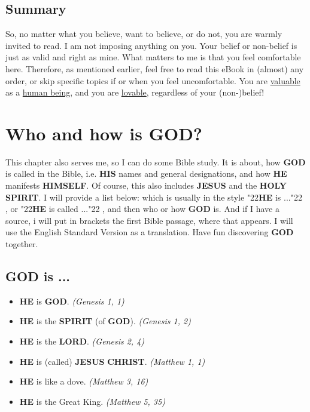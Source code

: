 \documentclass[10pt,a5paper]{article}
\newcommand{\Christ}[0]{\textbf{CHRIST}}
\newcommand{\God}[0]{\textbf{GOD}}
\newcommand{\He}[0]{\textbf{HE}}
\newcommand{\Himself}[0]{\textbf{HIMSELF}}
\newcommand{\His}[0]{\textbf{HIS}}
\newcommand{\Holy}[0]{\textbf{HOLY}}
\newcommand{\Jesus}[0]{\textbf{JESUS}}
\newcommand{\Lord}[0]{\textbf{LORD}}
\newcommand{\Spirit}[0]{\textbf{SPIRIT}}
\newcommand{\q}[1]{\char"22{#1}\char"22 }
\begin{document}
	\subsection{Summary}
		So,
		no matter what you believe,
		want to believe,
		or do not,
		you are warmly invited to read.
		I am not imposing anything on you.
		Your belief or non-belief is just as valid and right as mine.
		What matters to me is that you feel comfortable here.
		Therefore,
		as mentioned earlier,
		feel free to read this eBook in (almost) any order,
		or skip specific topics if or when you feel uncomfortable.
		You are \underline{valuable} as a \underline{human being},
		and you are \underline{lovable},
		regardless of your (non-)belief!
		
	\newpage
	\section{Who and how is {\God}?}
		This chapter also serves me,
		so I can do some Bible study.
		It is about,
		how {\God} is called in the Bible,
		i.e. {\His} names and general designations,
		and how {\He} manifests {\Himself}.
		Of course,
		this also includes {\Jesus} and the {\Holy} {\Spirit}.
		I will provide a list below:
		which is usually in the style \q{{\He} is ...},
		or \q{{\He} is called ...},
		and then who or how {\God} is.
		And if I have a source,
		i will put in brackets the first Bible passage,
		where that appears.
		I will use the English Standard Version as a translation.
		Have fun discovering {\God} together.

	\subsection{{\God} is ...}
		\begin{itemize}[nosep]
			\item {\He} is {\God}. \textit{(Genesis 1, 1)}
			\item {\He} is the {\Spirit} (of {\God}). \textit{(Genesis 1, 2)}
			\item {\He} is the {\Lord}. \textit{(Genesis 2, 4)}
			\item {\He} is (called) {\Jesus} {\Christ}. \textit{(Matthew 1, 1)}
			\item {\He} is like a dove. \textit{(Matthew 3, 16)}
			\item {\He} is the Great King. \textit{(Matthew 5, 35)}
		\end{itemize}

	\newpage
\end{document}
